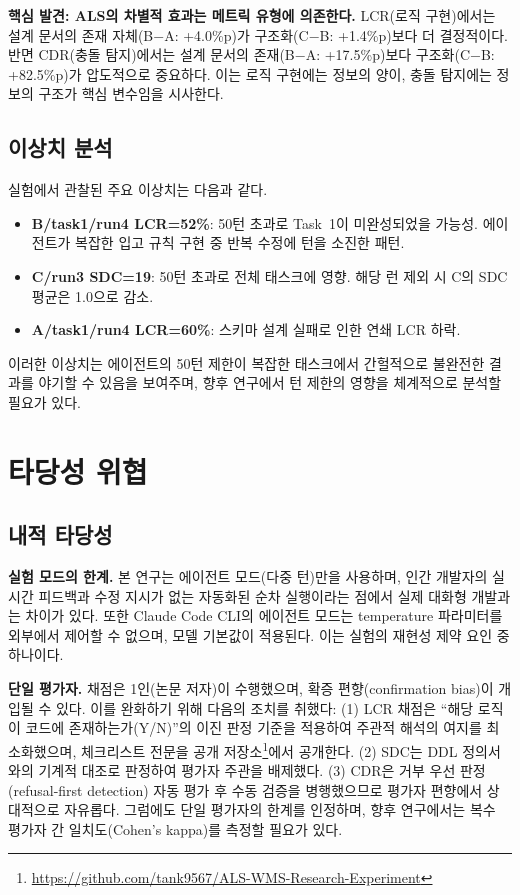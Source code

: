 \documentclass[conference]{IEEEtran}
\begin{document}
\textbf{핵심 발견: ALS의 차별적 효과는 메트릭 유형에 의존한다.} LCR(로직 구현)에서는 설계 문서의 존재 자체(B$-$A: +4.0\%p)가 구조화(C$-$B: +1.4\%p)보다 더 결정적이다. 반면 CDR(충돌 탐지)에서는 설계 문서의 존재(B$-$A: +17.5\%p)보다 구조화(C$-$B: +82.5\%p)가 압도적으로 중요하다. 이는 로직 구현에는 정보의 양이, 충돌 탐지에는 정보의 구조가 핵심 변수임을 시사한다.

\subsection{이상치 분석}

실험에서 관찰된 주요 이상치는 다음과 같다.

\begin{itemize}
  \item \textbf{B/task1/run4 LCR=52\%}: 50턴 초과로 Task~1이 미완성되었을 가능성. 에이전트가 복잡한 입고 규칙 구현 중 반복 수정에 턴을 소진한 패턴.
  \item \textbf{C/run3 SDC=19}: 50턴 초과로 전체 태스크에 영향. 해당 런 제외 시 C의 SDC 평균은 1.0으로 감소.
  \item \textbf{A/task1/run4 LCR=60\%}: 스키마 설계 실패로 인한 연쇄 LCR 하락.
\end{itemize}

이러한 이상치는 에이전트의 50턴 제한이 복잡한 태스크에서 간헐적으로 불완전한 결과를 야기할 수 있음을 보여주며, 향후 연구에서 턴 제한의 영향을 체계적으로 분석할 필요가 있다.

\section{타당성 위협}

\subsection{내적 타당성}

\textbf{실험 모드의 한계.} 본 연구는 에이전트 모드(다중 턴)만을 사용하며, 인간 개발자의 실시간 피드백과 수정 지시가 없는 자동화된 순차 실행이라는 점에서 실제 대화형 개발과는 차이가 있다. 또한 Claude Code CLI의 에이전트 모드는 temperature 파라미터를 외부에서 제어할 수 없으며, 모델 기본값이 적용된다. 이는 실험의 재현성 제약 요인 중 하나이다.

\textbf{단일 평가자.} 채점은 1인(논문 저자)이 수행했으며, 확증 편향(confirmation bias)이 개입될 수 있다. 이를 완화하기 위해 다음의 조치를 취했다: (1) LCR 채점은 ``해당 로직이 코드에 존재하는가(Y/N)''의 이진 판정 기준을 적용하여 주관적 해석의 여지를 최소화했으며, 체크리스트 전문을 공개 저장소\footnote{\url{https://github.com/tank9567/ALS-WMS-Research-Experiment}}에서 공개한다. (2) SDC는 DDL 정의서와의 기계적 대조로 판정하여 평가자 주관을 배제했다. (3) CDR은 거부 우선 판정(refusal-first detection) 자동 평가 후 수동 검증을 병행했으므로 평가자 편향에서 상대적으로 자유롭다. 그럼에도 단일 평가자의 한계를 인정하며, 향후 연구에서는 복수 평가자 간 일치도(Cohen's kappa)를 측정할 필요가 있다.
\end{document}
